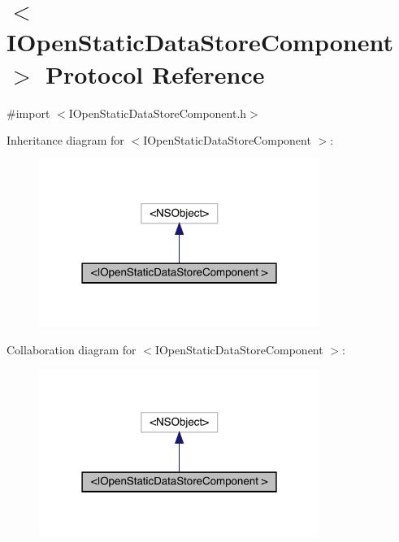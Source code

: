 \hypertarget{protocol_i_open_static_data_store_component_01-p}{}\section{$<$I\+Open\+Static\+Data\+Store\+Component $>$ Protocol Reference}
\label{protocol_i_open_static_data_store_component_01-p}


{\ttfamily \#import $<$I\+Open\+Static\+Data\+Store\+Component.\+h$>$}



Inheritance diagram for $<$I\+Open\+Static\+Data\+Store\+Component $>$\+:\nopagebreak
\begin{figure}[H]
\begin{center}
\leavevmode
\includegraphics[width=259pt]{protocol_i_open_static_data_store_component_01-p__inherit__graph}
\end{center}
\end{figure}


Collaboration diagram for $<$I\+Open\+Static\+Data\+Store\+Component $>$\+:\nopagebreak
\begin{figure}[H]
\begin{center}
\leavevmode
\includegraphics[width=259pt]{protocol_i_open_static_data_store_component_01-p__coll__graph}
\end{center}
\end{figure}
